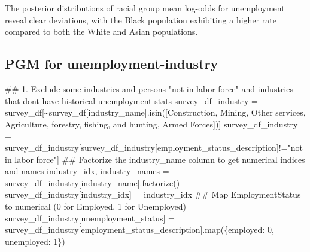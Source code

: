 \documentclass[
]{agujournal2019}
\newenvironment{Shaded}{\begin{snugshade}}{\end{snugshade}}
\newcommand{\BuiltInTok}[1]{\textcolor[rgb]{0.00,0.23,0.31}{#1}}
\newcommand{\CommentTok}[1]{\textcolor[rgb]{0.37,0.37,0.37}{#1}}
\newcommand{\DecValTok}[1]{\textcolor[rgb]{0.68,0.00,0.00}{#1}}
\newcommand{\NormalTok}[1]{\textcolor[rgb]{0.00,0.23,0.31}{#1}}
\newcommand{\OperatorTok}[1]{\textcolor[rgb]{0.37,0.37,0.37}{#1}}
\newcommand{\StringTok}[1]{\textcolor[rgb]{0.13,0.47,0.30}{#1}}
\begin{document}
The posterior distributions of racial group mean log-odds for
unemployment reveal clear deviations, with the Black population
exhibiting a higher rate compared to both the White and Asian
populations.

\subsection{PGM for
unemployment-industry}\label{pgm-for-unemployment-industry}

\begin{Shaded}
\begin{Highlighting}[]
\CommentTok{\#\# 1. Exclude some industries and persons "not in labor force" and industries that don\textquotesingle{}t have historical unemployment stats}
\NormalTok{survey\_df\_industry }\OperatorTok{=}\NormalTok{ survey\_df[}\OperatorTok{\textasciitilde{}}\NormalTok{survey\_df[}\StringTok{\textquotesingle{}industry\_name\textquotesingle{}}\NormalTok{].isin([}\StringTok{\textquotesingle{}Construction\textquotesingle{}}\NormalTok{,}
                              \StringTok{\textquotesingle{}Mining\textquotesingle{}}\NormalTok{,}
                              \StringTok{\textquotesingle{}Other services\textquotesingle{}}\NormalTok{,}
                              \StringTok{\textquotesingle{}Agriculture, forestry, fishing, and hunting\textquotesingle{}}\NormalTok{,}
                              \StringTok{\textquotesingle{}Armed Forces\textquotesingle{}}\NormalTok{])]}
\NormalTok{survey\_df\_industry }\OperatorTok{=}\NormalTok{ survey\_df\_industry[survey\_df\_industry[}\StringTok{\textquotesingle{}employment\_status\_description\textquotesingle{}}\NormalTok{]}\OperatorTok{!=}\StringTok{"not in labor force"}\NormalTok{]}
\CommentTok{\#\# Factorize the industry\_name column to get numerical indices and names}
\NormalTok{industry\_idx, industry\_names }\OperatorTok{=}\NormalTok{ survey\_df\_industry[}\StringTok{\textquotesingle{}industry\_name\textquotesingle{}}\NormalTok{].factorize()}
\NormalTok{survey\_df\_industry[}\StringTok{\textquotesingle{}industry\_idx\textquotesingle{}}\NormalTok{] }\OperatorTok{=}\NormalTok{ industry\_idx}
\CommentTok{\#\# Map EmploymentStatus to numerical (0 for Employed, 1 for Unemployed)}
\NormalTok{survey\_df\_industry[}\StringTok{\textquotesingle{}unemployment\_status\textquotesingle{}}\NormalTok{] }\OperatorTok{=}\NormalTok{ survey\_df\_industry[}\StringTok{\textquotesingle{}employment\_status\_description\textquotesingle{}}\NormalTok{].}\BuiltInTok{map}\NormalTok{(\{}\StringTok{\textquotesingle{}employed\textquotesingle{}}\NormalTok{: }\DecValTok{0}\NormalTok{, }\StringTok{\textquotesingle{}unemployed\textquotesingle{}}\NormalTok{: }\DecValTok{1}\NormalTok{\})}


\end{Highlighting}
\end{Shaded}
\end{document}
